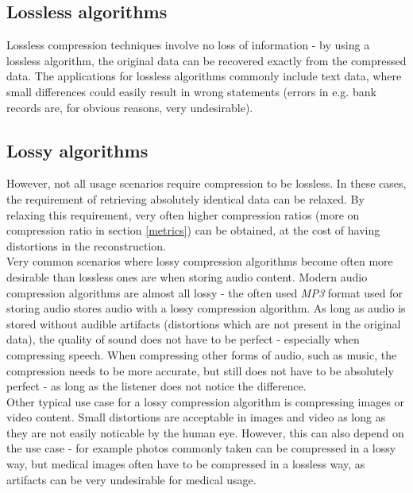 \documentclass[thesis=M,english]{FITthesis}[2012/10/20]
\begin{document}
\subsection{Lossless algorithms}
Lossless compression techniques involve no loss of information - by using
a lossless algorithm, the original data can be recovered exactly from the
compressed data. The applications for lossless algorithms commonly include
text data, where small differences could easily result in wrong statements
(errors in e.g. bank records are, for obvious reasons, very undesirable).


\subsection{Lossy algorithms}
However, not all usage scenarios require compression to be lossless. In
these cases, the requirement of retrieving absolutely identical data can
be relaxed. By relaxing this requirement, very often higher compression
ratios (more on compression ratio in section \ref{metrics}) can be obtained,
at the cost of having distortions in the reconstruction.
\\

Very common scenarios where lossy compression algorithms become often more
desirable than lossless ones are when storing audio content. Modern audio
compression algorithms are almost all lossy - the often used \emph{MP3}
format used for storing audio stores audio with a lossy compression
algorithm. As long as audio is stored without audible artifacts (distortions
which are not present in the original data), the quality of sound does not
have to be perfect - especially when compressing speech. When compressing
other forms of audio, such as music, the compression needs to be more accurate,
but still does not have to be absolutely perfect - as long as the listener
does not notice the difference.
\\

Other typical use case for a lossy compression algorithm is compressing images
or video content. Small distortions are acceptable in images and video as long
as they are not easily noticable by the human eye. However, this can also depend
on the use case - for example photos commonly taken can be compressed in a lossy
way, but medical images often have to be compressed in a lossless way, as artifacts
can be very undesirable for medical usage.
\end{document}
